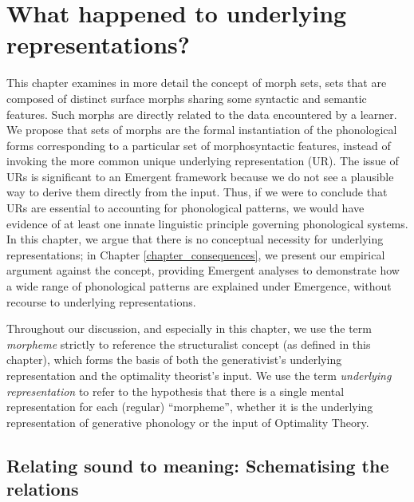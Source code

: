 
\chapter{What happened to underlying representations?} \label{chapter_URs} \label{ch4}

This chapter examines in more detail the concept of morph sets, sets that are composed of  distinct surface morphs sharing some syntactic and semantic features. Such morphs are directly related to the data encountered by a learner. We propose that sets of morphs are the formal instantiation of the phonological forms corresponding to a particular set of morphosyntactic features, instead of invoking the more common unique underlying representation (UR). The issue of URs is significant to an Emergent framework because we do not see a plausible way to derive them directly from the input. Thus, if we were to conclude that URs are essential to accounting for phonological patterns, we would have evidence of at least one innate linguistic principle governing phonological systems. In this chapter, we argue that there is no conceptual necessity for underlying representations; in Chapter \ref{chapter_consequences}, we present our empirical argument against the concept, providing Emergent analyses to demonstrate how a wide range of phonological patterns are explained under Emergence, without recourse to underlying representations.

Throughout our discussion, and especially in this chapter, we use the term \textit{morpheme}  strictly to reference the structuralist concept (as defined in this chapter), which forms the basis of both the generativist's underlying representation and the optimality theorist's input. We use the term \textit{underlying representation} to refer to the hypothesis that there is a single mental representation for each (regular) ``morpheme'',  whether it is the underlying representation of generative phonology or the input of Optimality Theory.


\section{Relating sound to meaning: Schematising the relations} \label{section_no-phon-motivation}

